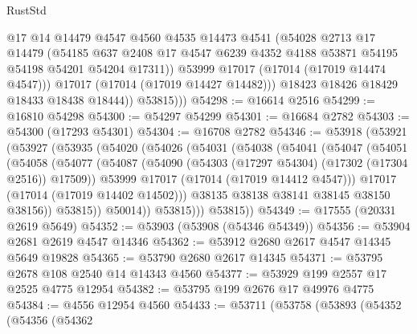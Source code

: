 \begin{lexlean}{RustStd}
\begin{coremodule}
{\begin{coremodule}
{{{{{{{{{{{{{{{{{{{{{{{{{{{{{{{{{{{{{{{{{{{{{{{{{{{{{{{                  @17
                  @14
                  @14479
                  @4547
                  @4560
                  @4535
                  @14473
                  @4541
                  (@54028
                    @2713
                    @17
                    @14479
                    (@54185
                      @637
                      @2408
                      @17
                      @4547
                      @6239
                      @4352
                      @4188
                      @53871
                      @54195
                      @54198
                      @54201
                      @54204
                      @17311))
                  @53999
                  @17017
                  (@17014 (@17019 @14474 @4547)))
                @17017
                (@17014 (@17019 @14427 @14482)))
              @18423
              @18426
              @18429
              @18433
              @18438
              @18444))
          @53815)))
@54298 := @16614 @2516
@54299 := @16810 @54298
@54300 := @54297 @54299
@54301 := @16684 @2782
@54303 := @54300 (@17293 @54301)
@54304 := @16708 @2782
@54346 := @53918
    (@53921
      (@53927
        (@53935
          (@54020
            (@54026
              (@54031
                (@54038
                  (@54041
                    (@54047
                      (@54051
                        (@54058
                          (@54077
                            (@54087
                              (@54090 (@54303 (@17297 @54304) (@17302 (@17304 @2516)) @17509))
                              @53999
                              @17017
                              (@17014 (@17019 @14412 @4547)))
                            @17017
                            (@17014 (@17019 @14402 @14502)))
                          @38135
                          @38138
                          @38141
                          @38145
                          @38150
                          @38156))
                      @53815))
                  @50014))
              @53815)))
        @53815))
@54349 := @17555 (@20331 @2619 @5649)
@54352 := @53903 (@53908 (@54346 @54349))
@54356 := @53904 @2681 @2619 @4547 @14346
@54362 := @53912 @2680 @2617 @4547 @14345 @5649 @19828
@54365 := @53790 @2680 @2617 @14345
@54371 := @53795 @2678 @108 @2540 @14 @14343 @4560
@54377 := @53929 @199 @2557 @17 @2525 @4775 @12954
@54382 := @53795 @199 @2676 @17 @49976 @4775
@54384 := @4556 @12954 @4560
@54433 := @53711
    (@53758
      (@53893
        (@54352
          (@54356
            (@54362
}}}}}}}}}}}}}}}}}}}}}}}}}}}}}}}}}}}}}}}}}}}}}}}}}}}}}}}
\end{coremodule}}
\end{coremodule}
\end{lexlean}
